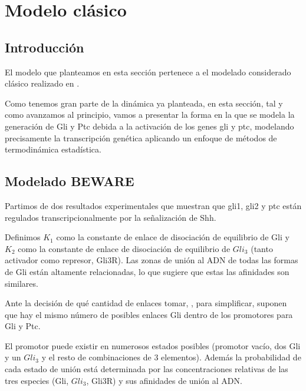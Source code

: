 
\chapter{Modelo clásico}

\label{ch:modelo_clasico}

\section{Introducción}
El modelo que planteamos en esta sección pertenece a el modelado considerado clásico realizado en \cite{schaffer}.

Como tenemos gran parte de la dinámica ya planteada, en esta sección, tal y como avanzamos al principio, vamos a presentar la forma en la que se modela la generación de Gli y Ptc debida a la activación de los genes gli y ptc, modelando precisamente la transcripción genética aplicando un enfoque de métodos de termodinámica estadística.

\section{Modelado BEWARE}
 
 
 
 Partimos de dos resultados experimentales que muestran que gli1, gli2 y ptc están regulados transcripcionalmente por la señalización de Shh.
 
  Definimos $K_1$ como la constante de enlace de disociación de equilibrio de Gli y $K_2$ como la constante de enlace de disociación de equilibrio de $Gli_3$ (tanto activador como represor, Gli3R). Las zonas de unión al ADN de todas las formas de Gli están altamente relacionadas, lo que sugiere que estas las afinidades son similares.
  
  Ante la decisión de qué cantidad de enlaces tomar, \cite{schaffer}, para simplificar, suponen que hay el mismo número de posibles enlaces Gli dentro de los
  promotores para Gli y Ptc.
  
  
  El promotor puede existir en numerosos
  estados posibles (promotor vacío, dos Gli  y un $Gli_3$ y el resto de combinaciones de 3 elementos). Además la probabilidad de cada estado de unión está determinada por las concentraciones relativas de las tres especies (Gli, $Gli_3$, Gli3R) y sus afinidades de unión al ADN. 
  

